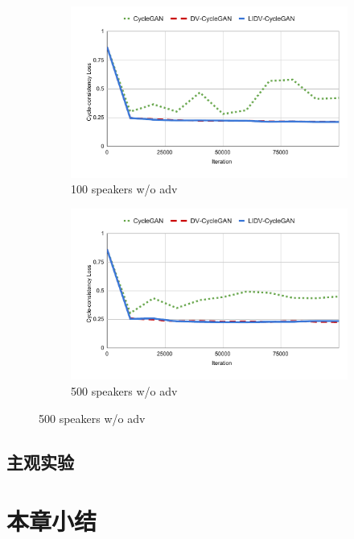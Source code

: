 \begin{figure}[!ht]
    \begin{minipage}[b]{\linewidth}
        \begin{subfigure}[b]{0.48\linewidth}
            \centering
            \includegraphics[width=\linewidth,trim=0 0 0 0,clip]{figure/5_cycle1.pdf}
            \caption{100 speakers w/o adv}
        \end{subfigure}        
        \begin{subfigure}[b]{0.48\linewidth}
            \centering
            \includegraphics[width=\linewidth,trim=0 0 0 0,clip]{figure/5_cycle2.pdf}
            \caption{500 speakers w/o adv}
        \end{subfigure}   
    \end{minipage}
\end{figure}


\subsection{主观实验}

\section{本章小结}